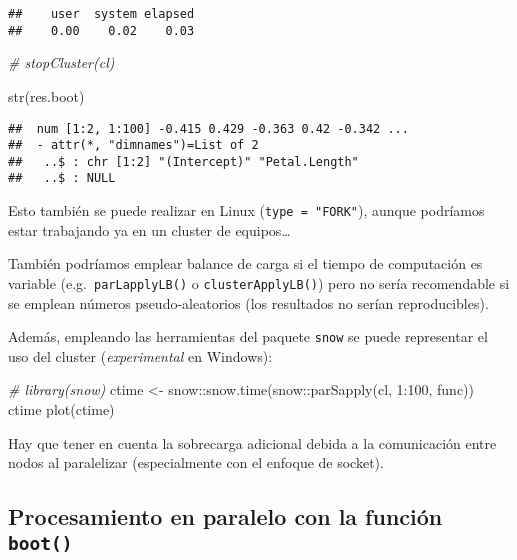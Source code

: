 \documentclass[
]{book}
\newenvironment{Shaded}{\begin{snugshade}}{\end{snugshade}}
\newcommand{\CommentTok}[1]{\textcolor[rgb]{0.56,0.35,0.01}{\textit{#1}}}
\newcommand{\DecValTok}[1]{\textcolor[rgb]{0.00,0.00,0.81}{#1}}
\newcommand{\FunctionTok}[1]{\textcolor[rgb]{0.00,0.00,0.00}{#1}}
\newcommand{\NormalTok}[1]{#1}
\newcommand{\OtherTok}[1]{\textcolor[rgb]{0.56,0.35,0.01}{#1}}
\newcommand{\SpecialCharTok}[1]{\textcolor[rgb]{0.00,0.00,0.00}{#1}}
\theoremstyle{break}
\theoremstyle{definition}
\theoremstyle{definition}
\theoremstyle{definition}
\theoremstyle{definition}
\theoremstyle{remark}
\begin{document}
\begin{verbatim}
##    user  system elapsed 
##    0.00    0.02    0.03
\end{verbatim}

\begin{Shaded}
\begin{Highlighting}[]
\CommentTok{\# stopCluster(cl)}

\FunctionTok{str}\NormalTok{(res.boot)}
\end{Highlighting}
\end{Shaded}

\begin{verbatim}
##  num [1:2, 1:100] -0.415 0.429 -0.363 0.42 -0.342 ...
##  - attr(*, "dimnames")=List of 2
##   ..$ : chr [1:2] "(Intercept)" "Petal.Length"
##   ..$ : NULL
\end{verbatim}

Esto también se puede realizar en Linux (\texttt{type\ =\ "FORK"}),
aunque podríamos estar trabajando ya en un cluster de equipos\ldots{}

También podríamos emplear balance de carga si el tiempo de computación es variable
(e.g.~\texttt{parLapplyLB()} o \texttt{clusterApplyLB()}) pero no sería recomendable si se emplean
números pseudo-aleatorios (los resultados no serían reproducibles).

Además, empleando las herramientas del paquete \texttt{snow} se puede representar el uso
del cluster (\emph{experimental} en Windows):

\begin{Shaded}
\begin{Highlighting}[]
\CommentTok{\# library(snow)}
\NormalTok{ctime }\OtherTok{\textless{}{-}}\NormalTok{ snow}\SpecialCharTok{::}\FunctionTok{snow.time}\NormalTok{(snow}\SpecialCharTok{::}\FunctionTok{parSapply}\NormalTok{(cl, }\DecValTok{1}\SpecialCharTok{:}\DecValTok{100}\NormalTok{, func))}
\NormalTok{ctime}
\FunctionTok{plot}\NormalTok{(ctime)}
\end{Highlighting}
\end{Shaded}

Hay que tener en cuenta la sobrecarga adicional debida a la comunicación entre nodos
al paralelizar (especialmente con el enfoque de socket).

\hypertarget{procesamiento-en-paralelo-con-la-funciuxf3n-boot}{%
\subsection{\texorpdfstring{Procesamiento en paralelo con la función \texttt{boot()}}{Procesamiento en paralelo con la función boot()}}\label{procesamiento-en-paralelo-con-la-funciuxf3n-boot}}
\end{document}
